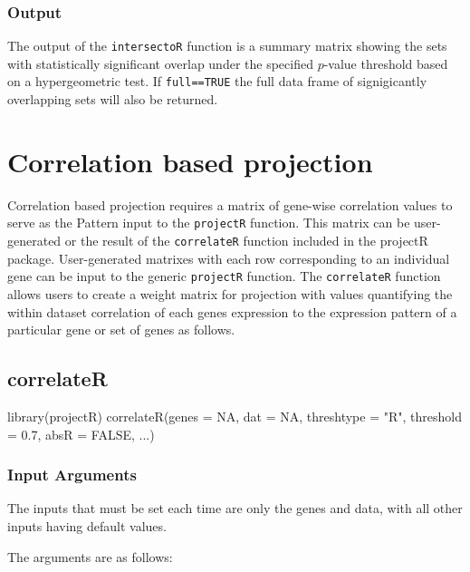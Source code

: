 \documentclass[]{article}
\renewenvironment{verbatim}{\color{codecolor}\begin{myshaded}\begin{oldverbatim}}{\end{oldverbatim}\end{myshaded}}
\begin{document}
\hypertarget{output-3}{%
\subsubsection{Output}\label{output-3}}

The output of the \texttt{intersectoR} function is a summary matrix showing the sets with statistically significant overlap under the specified \(p\)-value threshold based on a hypergeometric test. If \texttt{full==TRUE} the full data frame of signigicantly overlapping sets will also be returned.

\hypertarget{correlation-based-projection}{%
\section{Correlation based projection}\label{correlation-based-projection}}

Correlation based projection requires a matrix of gene-wise correlation values to serve as the Pattern input to the \texttt{projectR} function. This matrix can be user-generated or the result of the \texttt{correlateR} function included in the projectR package. User-generated matrixes with each row corresponding to an individual gene can be input to the generic \texttt{projectR} function. The \texttt{correlateR} function allows users to create a weight matrix for projection with values quantifying the within dataset correlation of each genes expression to the expression pattern of a particular gene or set of genes as follows.

\hypertarget{correlater}{%
\subsection{correlateR}\label{correlater}}

\begin{verbatim}
library(projectR)
correlateR(genes = NA, dat = NA, threshtype = "R", threshold = 0.7, absR = FALSE, ...)
\end{verbatim}

\hypertarget{input-arguments-4}{%
\subsubsection{Input Arguments}\label{input-arguments-4}}

The inputs that must be set each time are only the genes and data, with all other inputs having default values.

The arguments are as follows:
\end{document}
